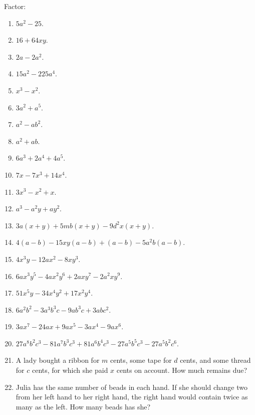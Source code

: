 \documentclass{book}
\begin{document}
Factor:
\begin{enumerate}
\item $5a^2 - 25$.

\item $16 + 64xy$.

\item $2a - 2a^2$.

\item $15a^2 - 225a^4$.

\item $x^3 - x^2$.

\item $3a^2 + a^5$.

\item $a^2 - ab^2$.

\item $a^2 + ab$.

\item $6a^3 + 2a^4 + 4a^5$.

\item $7x - 7x^3 +14x^4$.

\item $3x^3 - x^2 + x$.

\item $a^3 - a^2 y + ay^2$.

\item $3a(x + y) + 5mb(x + y) - 9d^2 x(x + y)$.

\item $4(a - b) - 15 x y (a - b) + (a - b) - 5 a^2 b(a - b)$.

\item $4x^3 y - 12a x^2 - 8 x y^3$.

\item $6 a x^3 y^5 - 4 a x^2 y^6 + 2 a x y^7 - 2 a^2 x y^9$.

\item $51 x^5 y - 34 x^4 y^2 + 17 x^2 y^4$.

\item $6 a^2 b^2 - 3 a^3 b^3 c - 9 a b^3 c + 3 abc^2$.

\item $3 a x^7 - 24 a x + 9 ax^5 - 3 ax^4 - 9 ax^6$.

\item $27 a^8 b^2 c^3 - 81 a^7 b^3 c^3 + 81 a^6 b^4 c^3 - 27 a^5
b^5 c^3 - 27 a^5 b^2 c^6$.

\item A lady bought a ribbon for $m$ cents, some tape for $d$
cents, and some thread for $c$ cents, for which she paid $x$ cents
on account. How much remains due?

\item Julia has the same number of beads in each hand. If she
should change two from her left hand to her right hand, the right
hand would contain twice as many as the left. How many beads has
she?

\end{enumerate}
\end{document}

